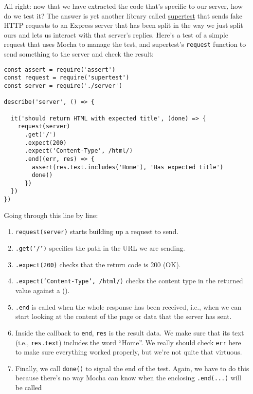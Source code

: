 All right:
now that we have extracted the code that's specific to our server,
how do we test it?
The answer is yet another library called \href{https://github.com/visionmedia/supertest}{supertest}
that sends fake HTTP requests to an Express server
that has been split in the way we just split ours
and lets us interact with that server's replies.
Here's a test of a simple request that uses Mocha to manage the test,
and supertest's \texttt{request} function to send something to the server
and check the result:

\begin{verbatim}
const assert = require('assert')
const request = require('supertest')
const server = require('./server')

describe('server', () => {

  it('should return HTML with expected title', (done) => {
    request(server)
      .get('/')
      .expect(200)
      .expect('Content-Type', /html/)
      .end((err, res) => {
        assert(res.text.includes('Home'), 'Has expected title')
        done()
      })
  })
})
\end{verbatim}

Going through this line by line:

\begin{enumerate}
\item
  \texttt{request(server)} starts building up a request to send.
\item
  \texttt{.get('/')} specifies the path in the URL we are sending.
\item
  \texttt{.expect(200)} checks that the return code is 200 (OK).
\item
  \texttt{.expect('Content-Type',\ /html/)}
  checks the content type in the returned value against
  a  ().
\item
  \texttt{.end} is called when the whole response has been received,
  i.e., when we can start looking at the content of the page or data
  that the server has sent.
\item
  Inside the callback to \texttt{end},
  \texttt{res} is the result data.
  We make sure that its text (i.e., \texttt{res.text}) includes the word ``Home''.
  We really should check \texttt{err} here to make sure everything worked properly,
  but we're not quite that virtuous.
\item
  Finally, we call \texttt{done()} to signal the end of the test.
  Again,
  we have to do this because there's no way Mocha can know
  when the enclosing \texttt{.end(...)} will be called
\end{enumerate}

